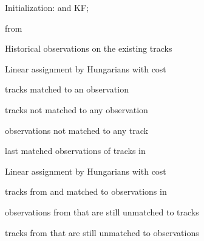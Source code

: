 \documentclass[10pt,twocolumn,letterpaper]{article}
\begin{document}
\begin{algorithm*}
\SetAlgoLined
\DontPrintSemicolon
\SetNoFillComment
{}

Initialization:  and KF;

{   
    \BlankLine
	
    
 
     from  
    


     Historical observations on the existing tracks
    
	
	Linear assignment by Hungarians with cost 
	
	 tracks matched to an observation
	
	 tracks not matched to any observation
	
	 observations not matched to any track
	

    \BlankLine	
	\BlankLine
	
	 last matched observations of tracks in 
	
	
	
	Linear assignment by Hungarians with cost 	
	
	 tracks from  and matched to observations in 
	
	 observations from  that are still unmatched to tracks
	
	 tracks from  that are still unmatched to observations
	
	
	
	\BlankLine	
	\BlankLine
	
	}
\end{algorithm*}
\end{document}
